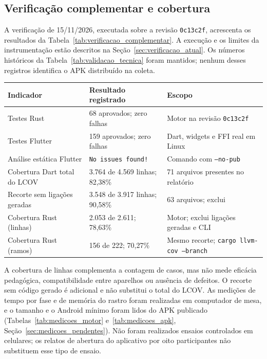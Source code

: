 \subsection{Verificação complementar e cobertura}
\label{sec:resultados_verificacao_atual}

A verificação de 15/11/2026, executada sobre a revisão \texttt{0c13c2f}, acrescenta
os resultados da Tabela~\ref{tab:verificacao_complementar}. A execução e os
limites da instrumentação estão descritos na Seção~\ref{sec:verificacao_atual}.
Os números históricos da Tabela~\ref{tab:validacao_tecnica} foram mantidos;
nenhum desses registros identifica o APK distribuído na coleta.

\begin{table}[htb]
\centering
{}
\footnotesize
\begin{tabular}{P{4.2cm}P{4.1cm}P{4.5cm}}
\toprule
Indicador & Resultado registrado & Escopo \\
\midrule
Testes Rust & 68 aprovados; zero falhas & Motor na revisão \texttt{0c13c2f} \\
Testes Flutter & 159 aprovados; zero falhas & Dart, widgets e FFI real em Linux \\
Análise estática Flutter & \texttt{No issues found!} & Comando com \texttt{--no-pub} \\
Cobertura Dart total do LCOV & 3.764 de 4.569 linhas; 82,38\% & 71 arquivos presentes no relatório \\
Recorte sem ligações geradas & 3.548 de 3.917 linhas; 90,58\% & 63 arquivos; exclui  \\
Cobertura Rust (linhas) & 2.053 de 2.611; 78,63\% & Motor; exclui ligações geradas e CLI \\
Cobertura Rust (ramos) & 156 de 222; 70,27\% & Mesmo recorte; \texttt{cargo llvm-cov --branch} \\
\bottomrule
\end{tabular}
\vspace{0.2cm}
\end{table}
\FloatBarrier

A cobertura de linhas complementa a contagem de casos, mas não mede eficácia
pedagógica, compatibilidade entre aparelhos ou ausência de defeitos. O recorte
sem código gerado é adicional e não substitui o total do LCOV. As medições de tempo
por fase e de memória do rastro foram realizadas em computador de mesa, e o tamanho e
o Android mínimo foram lidos do APK publicado
(Tabelas~\ref{tab:medicoes_motor} e~\ref{tab:medicoes_apk},
Seção~\ref{sec:medicoes_pendentes}). Não foram realizados ensaios controlados em
celulares; os relatos de abertura do aplicativo por oito participantes não
substituem esse tipo de ensaio.

